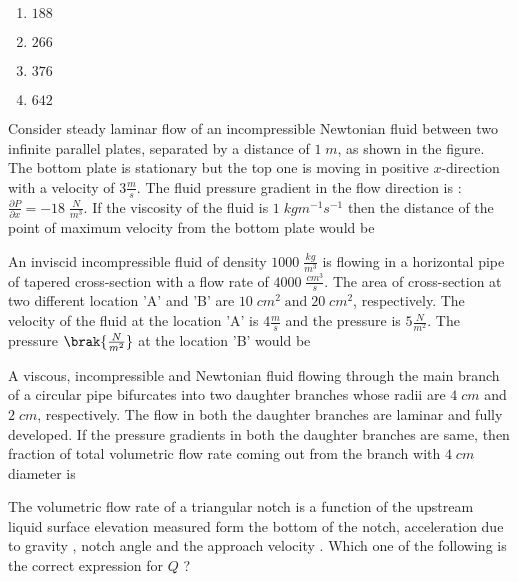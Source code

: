 	
\begin{enumerate}
    \item $188$
    \item $266$
    \item $376$
    \item $642$
\end{enumerate}
\item Consider steady laminar flow of an incompressible Newtonian fluid between two infinite parallel plates, separated by a distance of $1\;m$, as shown in the figure. The bottom plate is stationary but the top one is moving in positive $x$-direction with a velocity of $3\frac{m}{s}$. The fluid pressure gradient in the flow direction is : $\frac{\partial P}{\partial x}=-18\;\frac{N}{m^3}$. If the viscosity of the fluid is $1\;kgm^{-1}s^{-1}$ then the distance of the point of maximum velocity  from the bottom plate would be \underline{\hspace{2cm}}
	
\item An inviscid incompressible fluid of density $1000\;\frac{kg}{m^3}$ is flowing in a horizontal pipe of tapered cross-section with a flow rate of $4000\;\frac{cm^3}{s}$. The area of cross-section at two different location 'A' and 'B' are $10\;cm^2 \;\text{and} \;20\;cm^2$, respectively. The velocity of the fluid at the location 'A' is $4\frac{m}{s}$ and the pressure is $5\frac{N}{m^2}$. The pressure $\brak{\frac{N}{m^2}}$ at the location 'B' would be \underline{\hspace{2cm}}
\item A viscous, incompressible and Newtonian fluid flowing through the main branch of a circular pipe bifurcates into two daughter branches whose radii are $4\;cm$ and $2\;cm$, respectively. The flow in both the daughter branches are laminar and fully developed. If the pressure gradients in both the daughter branches are same, then fraction of total volumetric flow rate  coming out from the branch with $4\;cm$ diameter is \underline{\hspace{2cm}} 
	
\item The volumetric flow rate  of a triangular notch is a function of the upstream liquid surface elevation  measured form the bottom of the notch, acceleration due to gravity , notch angle \brak{\phi} and the approach velocity . Which one of the following is the correct expression for $Q$ ?
